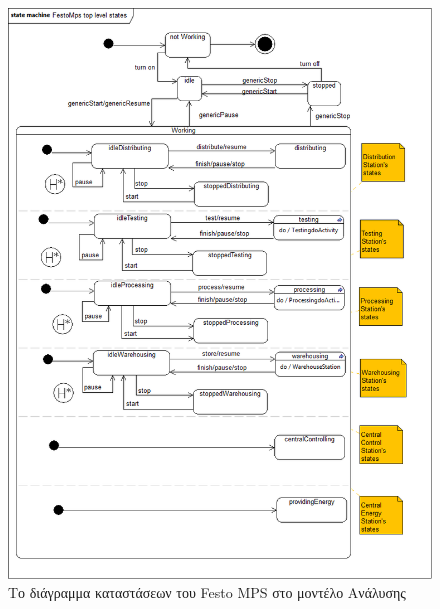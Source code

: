 \documentclass[a4paper,12pt,twoside]{report}
\begin{document}
\begin{appendices}
			\begin{figure}[hp]
					\centering
					\includegraphics[scale=0.30]{AnalysisModel_stm-FestoMpsTopLevelStates.png}
					\caption{Το διάγραμμα καταστάσεων του Festo MPS στο μοντέλο Ανάλυσης}
					\label{φωτ:Το διάγραμμα καταστάσεων του Festo MPS στο μοντέλο Ανάλυσης}
			\end{figure}
			

\end{appendices}
\end{document}
